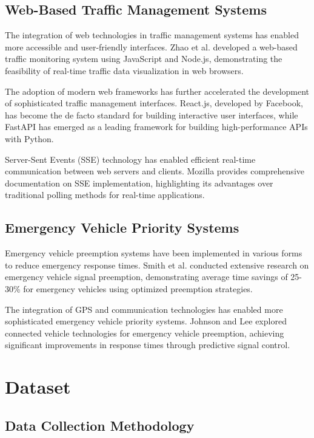 \documentclass[conference]{IEEEtran}
\begin{document}
\subsection{Web-Based Traffic Management Systems}

The integration of web technologies in traffic management systems has enabled more accessible and user-friendly interfaces. Zhao et al. developed a web-based traffic monitoring system using JavaScript and Node.js, demonstrating the feasibility of real-time traffic data visualization in web browsers.

The adoption of modern web frameworks has further accelerated the development of sophisticated traffic management interfaces. React.js, developed by Facebook, has become the de facto standard for building interactive user interfaces, while FastAPI has emerged as a leading framework for building high-performance APIs with Python.

Server-Sent Events (SSE) technology has enabled efficient real-time communication between web servers and clients. Mozilla provides comprehensive documentation on SSE implementation, highlighting its advantages over traditional polling methods for real-time applications.

\subsection{Emergency Vehicle Priority Systems}

Emergency vehicle preemption systems have been implemented in various forms to reduce emergency response times. Smith et al. conducted extensive research on emergency vehicle signal preemption, demonstrating average time savings of 25-30\% for emergency vehicles using optimized preemption strategies.

The integration of GPS and communication technologies has enabled more sophisticated emergency vehicle priority systems. Johnson and Lee explored connected vehicle technologies for emergency vehicle preemption, achieving significant improvements in response times through predictive signal control.

\section{Dataset}

\subsection{Data Collection Methodology}
\end{document}
